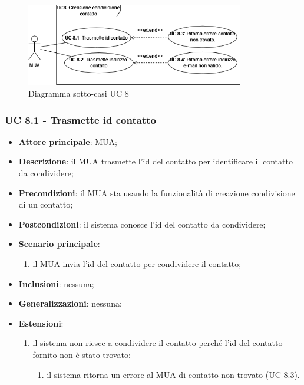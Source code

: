     \begin{figure}[H]
        \includegraphics[width=0.85\textwidth]{sections/uc_imgs/UC08.png}
        \centering
        \caption{Diagramma sotto-casi UC 8}
    \end{figure}

    \subsubsection{UC 8.1 - Trasmette id contatto} \label{sec:UC8.1}
    \begin{itemize}
        \item \textbf{Attore principale}: MUA;
        \item \textbf{Descrizione}: il MUA trasmette l'id del contatto per identificare il contatto da condividere;
        \item \textbf{Precondizioni}: il MUA sta usando la funzionalità di creazione condivisione di un contatto;
        \item \textbf{Postcondizioni}: il sistema conosce l'id del contatto da condividere;
        \item \textbf{Scenario principale}:
            \begin{enumerate}
                \item il MUA invia l'id del contatto per condividere il contatto;
            \end{enumerate}
        \item \textbf{Inclusioni}: nessuna;
        \item \textbf{Generalizzazioni}: nessuna;
        \item \textbf{Estensioni}:
            \begin{enumerate}[label=\alph*.]
                \item il sistema non riesce a condividere il contatto perché l'id del contatto fornito non è stato trovato:
                \begin{enumerate}[label=\arabic*.]
                    \item il sistema ritorna un errore al MUA di contatto non trovato (\hyperref[sec:UC8.3]{UC 8.3}).
                \end{enumerate}
            \end{enumerate}
    \end{itemize}



